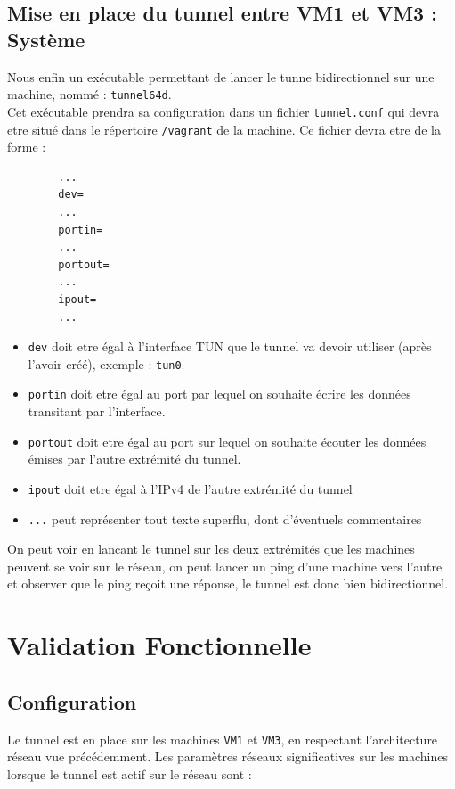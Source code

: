 \documentclass[a4paper, 10pt]{article}
\begin{document}
    \newpage
    \subsection{Mise en place du tunnel entre VM1 et VM3 : Système}
      Nous enfin un exécutable permettant de lancer le tunne bidirectionnel sur
      une machine, nommé : \verb+tunnel64d+. \\

      Cet exécutable prendra sa configuration dans un fichier \verb+tunnel.conf+
      qui devra etre situé dans le répertoire \verb+/vagrant+ de la machine. Ce
      fichier devra etre de la forme :
      \begin{verbatim}
        ...
        dev=
        ...
        portin=
        ...
        portout=
        ...
        ipout=
        ...
      \end{verbatim}

      \begin{itemize}
        \item \verb+dev+ doit etre égal à l'interface TUN que le tunnel va
              devoir utiliser (après l'avoir créé), exemple : \verb+tun0+.
        \item \verb+portin+ doit etre égal au port par lequel on souhaite écrire
              les données transitant par l'interface.
        \item \verb+portout+ doit etre égal au port sur lequel on souhaite
              écouter les données émises par l'autre extrémité du tunnel.
        \item \verb+ipout+ doit etre égal à l'IPv4 de l'autre extrémité du
              tunnel
        \item \verb+...+ peut représenter tout texte superflu, dont d'éventuels
              commentaires \\
      \end{itemize}

      On peut voir en lancant le tunnel sur les deux extrémités que les machines
      peuvent se voir sur le réseau, on peut lancer un ping d'une machine vers
      l'autre et observer que le ping reçoit une réponse, le tunnel est donc
      bien bidirectionnel.

  \section{Validation Fonctionnelle}
    \subsection{Configuration}
      Le tunnel est en place sur les machines \verb+VM1+ et \verb+VM3+, en
      respectant l'architecture réseau vue précédemment. Les paramètres réseaux
      significatives sur les machines lorsque le tunnel est actif sur le réseau
      sont :
\end{document}
